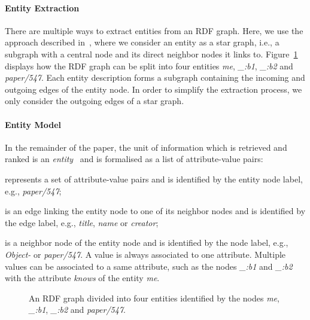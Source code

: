 \paragraph{Entity Extraction} There are multiple ways to extract entities from an RDF graph. Here, we use the approach described in~\cite{delbru:jws:entity}, where we consider an entity as a star graph, i.e., a subgraph with a central node and its direct neighbor nodes it links to. Figure~\ref{fig:rdf-graph} displays how the RDF graph can be split into four entities \emph{me}, \emph{\_:b1}, \emph{\_:b2} and \emph{paper/547}. Each entity description forms a subgraph containing the incoming and outgoing edges of the entity node. In order to simplify the extraction process, we only consider the outgoing edges of a star graph.

\paragraph{Entity Model} In the remainder of the paper, the unit of information which is retrieved and ranked is an \emph{entity}~\cite{delbru:jws:entity} and is formalised as a list of attribute-value pairs:
\begin{description}
  \item[Entity] represents a set of attribute-value pairs and is identified by the entity node label, e.g., \emph{paper/547};
  \item[Attribute] is an edge linking the entity node to one of its neighbor nodes and is identified by the edge label, e.g., \emph{title}, \emph{name} or \emph{creator};
  \item[Value] is a neighbor node of the entity node and is identified by the node label, e.g., \emph{Object-} or \emph{paper/547}. A value is always associated to one attribute. Multiple values can be associated to a same attribute, such as the nodes \emph{\_:b1} and \emph{\_:b2} with the attribute \emph{knows} of the entity \emph{me}.
\end{description}

\begin{figure}
\centering
{}
\caption{An RDF graph divided into four entities identified by the nodes \emph{me}, \emph{\_:b1}, \emph{\_:b2} and \emph{paper/547}.}
\label{fig:rdf-graph}
\vspace{-1em}
\end{figure}

